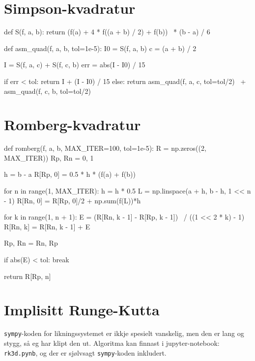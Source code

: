 \documentclass[12pt]{article}
\begin{document}
\begin{appendices}

    \section{Simpson-kvadratur} \label{a_simp}
    \noindent\begin{minipage}{\linewidth}
    \begin{python}[caption={Adaptiv Simpson-kvadratur}]
def S(f, a, b):
    return (f(a) + 4 * f((a + b) / 2) + f(b))  \
         * (b - a) / 6

def asm_quad(f, a, b, tol=1e-5):
    I0 = S(f, a, b)
    c = (a + b) / 2

    I = S(f, a, c) + S(f, c, b)
    err = abs(I - I0) / 15

    if err < tol:
        return I + (I - I0) / 15
    else:
        return asm_quad(f, a, c, tol=tol/2)  \
             + asm_quad(f, c, b, tol=tol/2)
    \end{python}
    \end{minipage}


    \section{Romberg-kvadratur} \label{a_rom}
    \noindent\begin{minipage}{\linewidth}
    \begin{python}[caption={Romberg-kvadratur}]
def romberg(f, a, b, MAX_ITER=100, tol=1e-5):
    R = np.zeros((2, MAX_ITER))
    Rp, Rn = 0, 1

    h = b - a
    R[Rp, 0] = 0.5 * h * (f(a) + f(b))

    for n in range(1, MAX_ITER):
        h = h * 0.5
        L = np.linspace(a + h, b - h, 1 << n - 1)
        R[Rn, 0] = R[Rp, 0]/2 + np.sum(f(L))*h

        for k in range(1, n + 1):
            E = (R[Rn, k - 1] - R[Rp, k - 1])  \
              / ((1 << 2 * k) - 1)
            R[Rn, k] = R[Rn, k - 1] + E

        Rp, Rn = Rn, Rp

        if abs(E) < tol: break

    return R[Rp, n]
    \end{python}
    \end{minipage}


    \section{Implisitt Runge-Kutta} \label{a_rk}
    {\tt sympy}-koden for likningssystemet er ikkje spesielt vanskelig,
    men den er lang og stygg, så eg har klipt den ut.
    Algoritma kan finnast i jupyter-notebook: {\tt rk3d.pynb},
    og der er sjølvsagt {\tt sympy}-koden inkludert.


\end{appendices}
\end{document}
